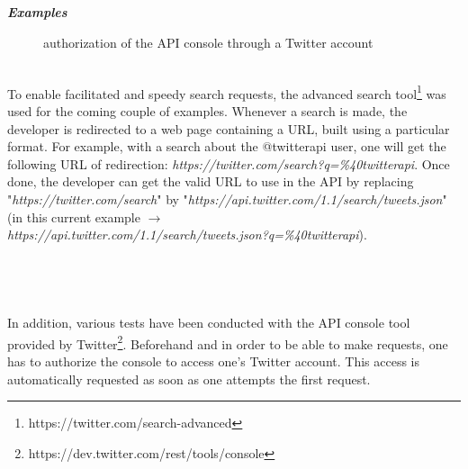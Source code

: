 \documentclass[a4paper,11pt]{report}
\begin{document}
\textbf{\emph{Examples}}\\
\begin{figure}
\vspace{-30pt}
\begin{center}
\caption{authorization of the API console through a Twitter account}
\end{center}
\vspace{-15pt}
\end{figure}
\\
To enable facilitated and speedy search requests, the advanced search tool\footnote{https://twitter.com/search-advanced} was used for the coming couple of examples. Whenever a search is made, the developer is redirected to a web page containing a URL, built using a particular format. For example, with a search about the @twitterapi user, one will get the following URL of redirection: \emph{https://twitter.com/search?q=\%40twitterapi}. Once done, the developer can get the valid URL to use in the API by replacing "\emph{https://twitter.com/search}" by "\emph{https://api.twitter.com/1.1/search/tweets.json}" (in this current example $\to$ \\\emph{https://api.twitter.com/1.1/search/tweets.json?q=\%40twitterapi}).\\\\\\\\\\
 
In addition, various tests have been conducted with the API console tool provided by Twitter\footnote{https://dev.twitter.com/rest/tools/console}. Beforehand and in order to be able to make requests, one has to authorize the console to access one's Twitter account. This access is automatically requested as soon as one attempts the first request.\\
\newpage 
\end{document}

